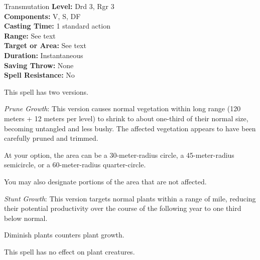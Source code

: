 {Transmutation}
{
	\textbf{Level:}
	Drd 3, Rgr 3\\
	\textbf{Components:}
	V, S, DF\\
	\textbf{Casting Time:}
	1 standard action\\
	\textbf{Range:}
	See text\\
	\textbf{Target or Area:}
	See text\\
	\textbf{Duration:}
	Instantaneous\\
	\textbf{Saving Throw:}
	None\\
	\textbf{Spell Resistance:}
	No\\
}
{
	This spell has two versions.

	\textit{Prune Growth}:
	This version causes normal vegetation within long range (120 meters + 12 meters per level) to shrink to about one-third of their normal size, becoming untangled and less bushy. The affected vegetation appears to have been carefully pruned and trimmed.

	At your option, the area can be a 30-meter-radius circle, a 45-meter-radius semicircle, or a 60-meter-radius quarter-circle.

	You may also designate portions of the area that are not affected.

	\textit{Stunt Growth}:
	This version targets normal plants within a range of \onehalf mile, reducing their potential productivity over the course of the following year to one third below normal.

	Diminish plants counters plant growth.

	This spell has no effect on plant creatures.

}
